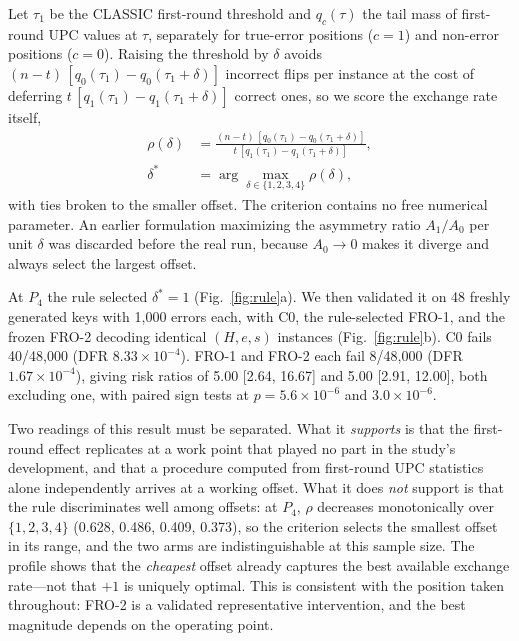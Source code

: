 \documentclass[lettersize,journal]{IEEEtran}
\begin{document}
Let $\tau_1$ be the CLASSIC first-round threshold and $q_c(\tau)$ the tail mass of first-round UPC values at $\tau$, separately for true-error positions ($c=1$) and non-error positions ($c=0$). Raising the threshold by $\delta$ avoids $(n-t)\,[q_0(\tau_1)-q_0(\tau_1+\delta)]$ incorrect flips per instance at the cost of deferring $t\,[q_1(\tau_1)-q_1(\tau_1+\delta)]$ correct ones, so we score the exchange rate itself,
\begin{equation}
\begin{aligned}
\rho(\delta)&=\frac{(n-t)\,[q_0(\tau_1)-q_0(\tau_1+\delta)]}
                   {t\,[q_1(\tau_1)-q_1(\tau_1+\delta)]},\\
\delta^{*}&=\arg\max_{\delta\in\{1,2,3,4\}}\rho(\delta),
\end{aligned}
\end{equation}
with ties broken to the smaller offset. The criterion contains no free numerical parameter. An earlier formulation maximizing the asymmetry ratio $A_1/A_0$ per unit $\delta$ was discarded before the real run, because $A_0\to0$ makes it diverge and always select the largest offset.

At $P_4$ the rule selected $\delta^{*}=1$ (Fig.~\ref{fig:rule}a). We then validated it on 48 freshly generated keys with 1{,}000 errors each, with C0, the rule-selected FRO-1, and the frozen FRO-2 decoding identical $(H,e,s)$ instances (Fig.~\ref{fig:rule}b). C0 fails 40/48{,}000 (DFR $8.33\times10^{-4}$). FRO-1 and FRO-2 each fail 8/48{,}000 (DFR $1.67\times10^{-4}$), giving risk ratios of 5.00 [2.64, 16.67] and 5.00 [2.91, 12.00], both excluding one, with paired sign tests at $p=5.6\times10^{-6}$ and $3.0\times10^{-6}$.

Two readings of this result must be separated. What it \emph{supports} is that the first-round effect replicates at a work point that played no part in the study's development, and that a procedure computed from first-round UPC statistics alone independently arrives at a working offset. What it does \emph{not} support is that the rule discriminates well among offsets: at $P_4$, $\rho$ decreases monotonically over $\{1,2,3,4\}$ (0.628, 0.486, 0.409, 0.373), so the criterion selects the smallest offset in its range, and the two arms are indistinguishable at this sample size. The profile shows that the \emph{cheapest} offset already captures the best available exchange rate---not that $+1$ is uniquely optimal. This is consistent with the position taken throughout: FRO-2 is a validated representative intervention, and the best magnitude depends on the operating point.
\end{document}
